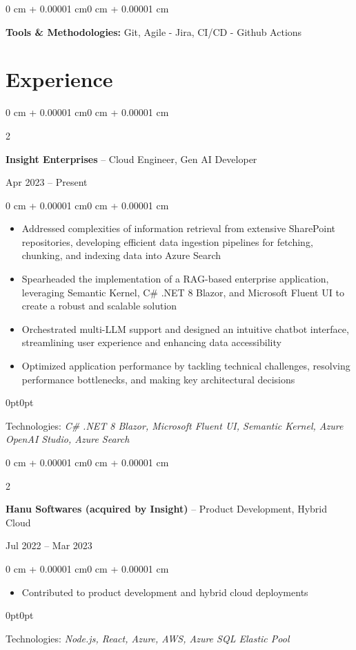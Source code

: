 \documentclass[10pt, letterpaper]{article}
\newenvironment{highlights}{
    \begin{itemize}[
        topsep=0.10 cm, parsep=0.10 cm, partopsep=0pt, itemsep=0pt,
        leftmargin=0 cm + 10pt
    ]
}{
    \end{itemize}
}
\newenvironment{techline}{
    \begin{adjustwidth}{0pt}{0pt}
    \vspace{0.05cm}
}{
    \vspace{0.05cm}
    \end{adjustwidth}
}
\newenvironment{onecolentry}{
    \begin{adjustwidth}{0 cm + 0.00001 cm}{0 cm + 0.00001 cm}
}{
    \end{adjustwidth}
}
\newenvironment{twocolentry}[2][]{
    \onecolentry
    \def\secondColumn{#2}
    \setcolumnwidth{\fill, 4.5 cm}
    \begin{paracol}{2}
}{
    \switchcolumn \raggedleft \secondColumn
    \end{paracol}
    \endonecolentry
}
\begin{document}
\begin{onecolentry}
    \textbf{Tools \& Methodologies:} Git, Agile - Jira, CI/CD - Github Actions
\end{onecolentry}

\section{Experience}

\begin{twocolentry}{Apr 2023 – Present}
    \textbf{Insight Enterprises} -- Cloud Engineer, Gen AI Developer
\end{twocolentry}
\begin{onecolentry}
    \begin{highlights}
        \item Addressed complexities of information retrieval from extensive SharePoint repositories, developing efficient data ingestion pipelines for fetching, chunking, and indexing data into Azure Search
        \item Spearheaded the implementation of a RAG-based enterprise application, leveraging Semantic Kernel, C\# .NET 8 Blazor, and Microsoft Fluent UI to create a robust and scalable solution
        \item Orchestrated multi-LLM support and designed an intuitive chatbot interface, streamlining user experience and enhancing data accessibility
        \item Optimized application performance by tackling technical challenges, resolving performance bottlenecks, and making key architectural decisions
    \end{highlights}
    
    \begin{techline}
        Technologies: \textit{C\# .NET 8 Blazor, Microsoft Fluent UI, Semantic Kernel, Azure OpenAI Studio, Azure Search}
    \end{techline}
\end{onecolentry}

\vspace{0.2 cm}

\begin{twocolentry}{Jul 2022 – Mar 2023}
    \textbf{Hanu Softwares (acquired by Insight)} -- Product Development, Hybrid Cloud
\end{twocolentry}
\begin{onecolentry}
    \begin{highlights}
        \item Contributed to product development and hybrid cloud deployments
    \end{highlights}
    \begin{techline}
        Technologies: \textit{Node.js, React, Azure, AWS, Azure SQL Elastic Pool}
    \end{techline}
\end{onecolentry}
\end{document}

